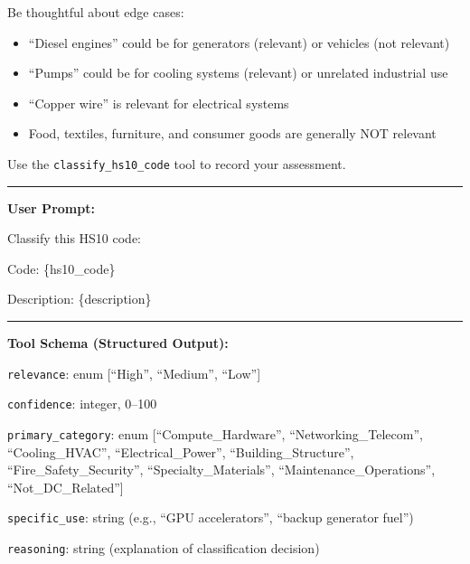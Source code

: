 \documentclass[12pt,pdftex]{article}
\newenvironment{prompt}{\par\medskip\noindent}{\par\medskip}
\begin{document}
\begin{onehalfspacing}
\begin{prompt}
\medskip

Be thoughtful about edge cases:
\begin{itemize}
    \item ``Diesel engines'' could be for generators (relevant) or vehicles (not relevant)
    \item ``Pumps'' could be for cooling systems (relevant) or unrelated industrial use
    \item ``Copper wire'' is relevant for electrical systems
    \item Food, textiles, furniture, and consumer goods are generally NOT relevant
\end{itemize}

\medskip

Use the \texttt{classify\_hs10\_code} tool to record your assessment.

\bigskip
\hrule
\bigskip

\textbf{User Prompt:}

\medskip

Classify this HS10 code:

Code: \{hs10\_code\}

Description: \{description\}

\bigskip
\hrule
\bigskip

\textbf{Tool Schema (Structured Output):}

\medskip

\texttt{relevance}: enum [``High'', ``Medium'', ``Low'']

\texttt{confidence}: integer, 0--100

\texttt{primary\_category}: enum [``Compute\_Hardware'', ``Networking\_Telecom'', ``Cooling\_HVAC'', ``Electrical\_Power'', ``Building\_Structure'', ``Fire\_Safety\_Security'', ``Specialty\_Materials'', ``Maintenance\_Operations'', ``Not\_DC\_Related'']

\texttt{specific\_use}: string (e.g., ``GPU accelerators'', ``backup generator fuel'')

\texttt{reasoning}: string (explanation of classification decision)

\end{prompt}

\newpage

\afterpage{%
\clearpage

}


\newpage

\afterpage{%
\clearpage

}


\end{onehalfspacing}
\end{document}
